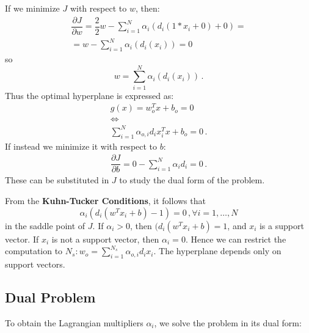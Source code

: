 If we minimize $J$ with respect to $w$, then:
\begin{gather*}
    \dfrac{\partial J}{\partial w} = \dfrac{2}{2} w - \sum_{i=1}^N \alpha_i(d_i(1*x_i + 0) + 0) = \\
    = w - \sum_{i=1}^N \alpha_i(d_i(x_i)) = 0
\end{gather*}
so
\begin{equation*}
    w = \sum_{i=1}^N \alpha_i(d_i(x_i)) \, .
\end{equation*}
Thus the optimal hyperplane is expressed as:
\begin{gather*}
    g(x) = w_o^T x + b_o = 0 \\
    \iff \\
    \sum_{i=1}^N \alpha_{o,i} d_i x_i^T x + b_o = 0 \, .
\end{gather*}
If instead we minimize it with respect to $b$:
\begin{gather*}
    \dfrac{\partial J}{\partial b} = 0 - \sum_{i=1}^N \alpha_i d_i = 0 \, .
\end{gather*}
These can be substituted in $J$ to study the dual form of the problem.

From the \textbf{Kuhn-Tucker Conditions}, it follows that
\begin{equation*}
    \alpha_i (d_i (w^T x_i + b) - 1) = 0 \, , \forall i = 1, \dots , N
\end{equation*}
in the saddle point of $J$. If $\alpha_i > 0$, then $(d_i (w^T x_i + b) = 1$, and $x_i$ is a support vector. If $x_i$ is not a support vector, then $\alpha_i = 0$. Hence we can restrict the computation to $N_s : w_o = \sum_{i=1}^{N_s} \alpha_{o,i} d_i x_i$. The hyperplane depends only on support vectors.

\subsection{Dual Problem}

To obtain the Lagrangian multipliers $\alpha_i$, we solve the problem in its dual form:

